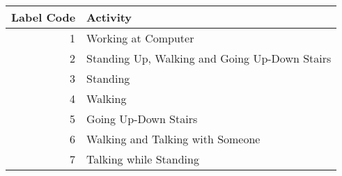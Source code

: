 \begin{tabular}{rl}
\toprule
   Label Code &  Activity \\
\midrule
  1 & Working at Computer               \\
  2 & Standing Up, Walking and Going Up-Down Stairs               \\
  3 & Standing                 \\
  4 & Walking     \\
  5 & Going Up-Down Stairs                \\
  6 & Walking and Talking with Someone                    \\
  7 & Talking while Standing          \\

\bottomrule
\end{tabular}
